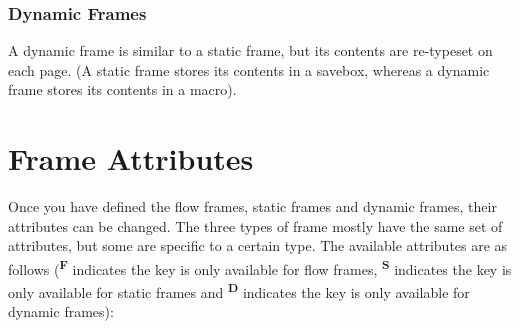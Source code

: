 \documentclass[a4paper]{article}
\begin{document}
\subsubsection{Dynamic Frames}

A dynamic frame is similar to a static frame, but its contents
are re-typeset on each page. (A static frame stores its
contents in a savebox, whereas a dynamic frame stores its
contents in a macro).

\section{Frame Attributes}
\label{sec:modattr}

Once you have defined the {flow frames}, {static frames} and
{dynamic frames}, their attributes can be changed.
The three types of frame mostly have the
same set of attributes, but some are specific to a certain type.
The available attributes are as follows
(\textsuperscript{\textbf{F}} indicates the key is
only available for {flow frames},
\textsuperscript{\textbf{S}} indicates the key is only available
for {static frames}
and \textsuperscript{\textbf{D}} indicates the key
is only available for {dynamic frames}):
\end{document}
